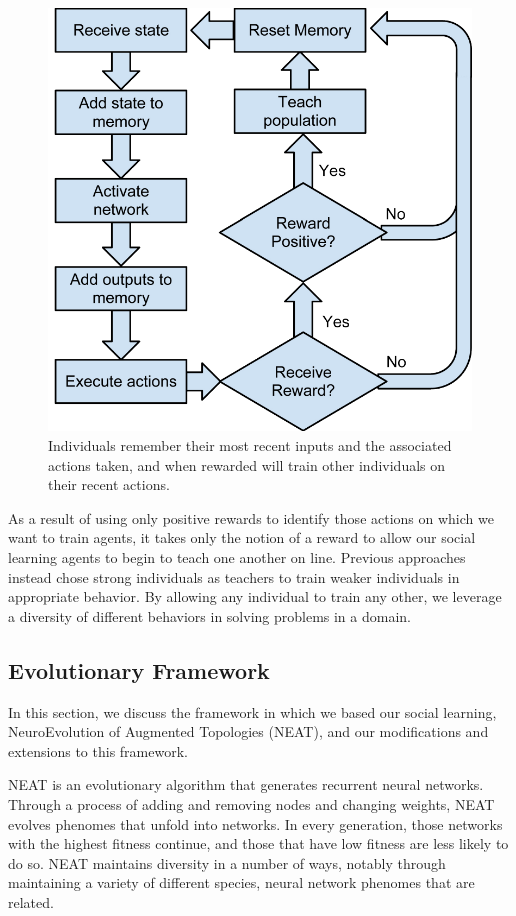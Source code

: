 \documentclass{acm_proc_article-sp}
\begin{document}
\begin{figure}
  \centering
    \includegraphics[scale=.6]{flowchart.pdf}
  \caption{Individuals remember their most recent inputs and the associated actions taken, and when rewarded will train other individuals on their recent actions.}
  \label{fig:flowchart}
\end{figure}


As a result of using only positive rewards to identify those actions on which we want to train agents, it takes only the notion of a reward to allow our social learning agents to begin to teach one another on line. Previous approaches \cite{denaro1996cultural} instead chose strong individuals as teachers to train weaker individuals in appropriate behavior. By allowing any individual to train any other, we leverage a diversity of different behaviors in solving problems in a domain.

\subsection*{Evolutionary Framework}
In this section, we discuss the framework in which we based our social learning, NeuroEvolution of Augmented Topologies (NEAT)\cite{stanley2002evolving}, and our modifications and extensions to this framework.

NEAT is an evolutionary algorithm that generates recurrent neural networks.  Through a process of adding and removing nodes and changing weights, NEAT evolves phenomes that unfold into networks.  In every generation, those networks with the highest fitness continue, and those that have low fitness are less likely to do so.  NEAT maintains diversity in a number of ways, notably through maintaining a variety of different species, neural network phenomes that are related.  
\end{document}
